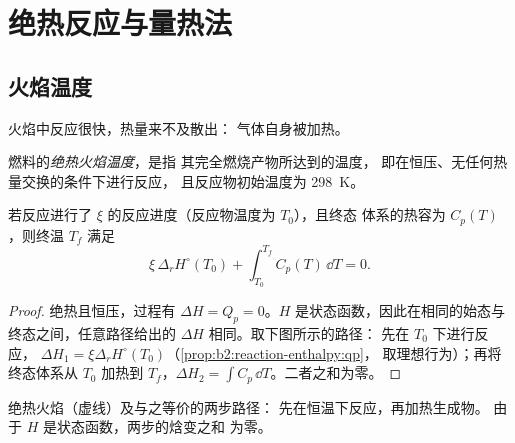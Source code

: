 \section{绝热反应与量热法}

\subsection*{火焰温度}

火焰中反应很快，热量来不及散出：
气体自身被加热。

\begin{definition}[绝热火焰温度]\label{def:b2:reaction-enthalpy:flame-temperature}
燃料的\emph{绝热火焰温度}，是指
其完全燃烧产物所达到的温度，
即在恒压、无任何热量交换的条件下进行反应，
且反应物初始温度为 \qty{298}{K}。
\end{definition}

\begin{proposition}[计算火焰温度]\label{prop:b2:reaction-enthalpy:flame}
若反应进行了 $\xi$ 的反应进度（反应物温度为 $T_0$），且终态
体系的热容为 $C_p(T)$，则终温 $T_f$ 满足
\[
  \xi\,\Delta_r H^\circ(T_0) + \int_{T_0}^{T_f}C_p(T)\,\dd T = 0 .
\]
\end{proposition}

\begin{proof}
绝热且恒压，过程有 $\Delta H =
Q_p = 0$。$H$ 是状态函数，因此在相同的始态与
终态之间，任意路径给出的 $\Delta H$ 相同。取下图所示的路径：
先在 $T_0$ 下进行反应，
$\Delta H_1 = \xi\Delta_r H^\circ(T_0)$（\cref{prop:b2:reaction-enthalpy:qp}，
取理想行为）；再将终态体系从 $T_0$ 加热到
$T_f$，$\Delta H_2 = \int C_p\,\dd T$。二者之和为零。
\end{proof}

\begin{omfigure}

{\small 绝热火焰（虚线）及与之等价的两步路径：
先在恒温下反应，再加热生成物。
由于 $H$ 是状态函数，两步的焓变之和
为零。}
\end{omfigure}

